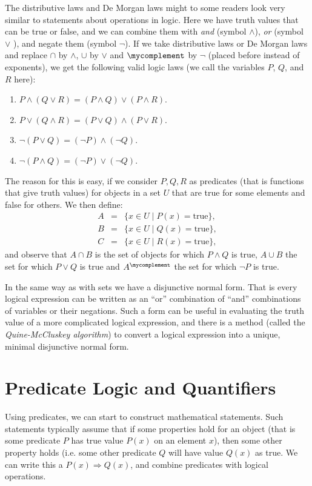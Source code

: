 The distributive laws and De Morgan laws might to some readers look very
similar to statements about operations in logic. Here we have truth values
that can be true or false, and we can combine them with {\em and} (symbol
$\wedge$),
{\em or} (symbol $\vee$
),
and negate them (symbol $\lnot$). If we take distributive laws or De Morgan
laws and replace $\cap$ by $\wedge$, $\cup$ by $\vee$ and $\mycomplement$ by
$\lnot$ (placed before instead of exponents), we get the following valid
logic laws (we call the variables $P$, $Q$, and $R$ here):
\begin{enumerate}
\item $P\wedge (Q\vee R)=(P\wedge Q)\vee(P\wedge R)$. 
\item $P\vee (Q\wedge R)=(P\vee Q)\wedge(P\vee R)$. 
\item $\lnot(P\vee Q)=(\lnot P)\wedge (\lnot Q)$.
\item $\lnot(P\wedge Q)=(\lnot P)\vee (\lnot Q)$.
\end{enumerate}
The reason for this is easy, if we consider $P,Q,R$ as predicates (that is
functions that give truth values) for
objects in a set $U$ that are true for some elements and false for others.
We then define:
\begin{eqnarray*}
A&=&\{x\in U\mid P(x)=\mbox{true}\},\\
B&=&\{x\in U\mid Q(x)=\mbox{true}\},\\
C&=&\{x\in U\mid R(x)=\mbox{true}\},
\end{eqnarray*}
and observe that $A\cap B$ is the set of objects for which $P\wedge Q$ is
true, $A\cup B$ the set for which $P\vee Q$ is true and $A^\mycomplement$ the
set for which $\lnot P$ is true.
\medskip

In the same way as with sets we have a disjunctive normal form. That is
every logical expression can be written as an ``or'' combination of ``and''
combinations of variables or their negations.
Such a form can be useful in evaluating the truth value of a more
complicated logical expression, and there is a method (called the
{\em Quine-McCluskey algorithm}) to convert a logical expression into a
unique, minimal disjunctive normal form.

\section{Predicate Logic and Quantifiers}

Using predicates, we can start to construct mathematical statements. Such
statements typically assume that if some properties hold for an object (that
is some predicate $P$ has true value $P(x)$ on an element $x$), then some
other property holds (i.e. some other predicate $Q$ will have value $Q(x)$
as true. We can write this a $P(x)\Rightarrow Q(x)$, and combine predicates
with logical operations.

